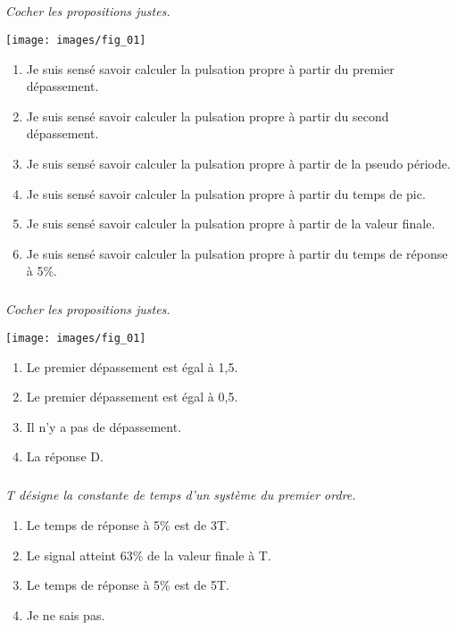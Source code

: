 \documentclass[10pt,fleqn]{article} %
\begin{document}
\begin{multicols}{2}
\subparagraph{}\textit{Cocher les propositions justes.}

\begin{center}
\texttt{[image: images/fig\_01]}
\end{center}

\begin{enumerate}
\item Je suis sensé savoir calculer la pulsation propre à partir du premier
dépassement.
\item Je suis sensé savoir calculer la pulsation propre à partir du second
dépassement.
\item Je suis sensé savoir calculer la pulsation propre à partir de la pseudo
période.
\item Je suis sensé savoir calculer la pulsation propre à partir du temps de pic.
\item Je suis sensé savoir calculer la pulsation propre à partir de la valeur finale.
\item Je suis sensé savoir calculer la pulsation propre à partir du temps de réponse à 5\%.
\end{enumerate}



\subparagraph{}\textit{Cocher les propositions justes.}

\begin{center}
\texttt{[image: images/fig\_01]}
\end{center}
 
\begin{enumerate}
\item Le premier dépassement est égal à 1,5.
\item Le premier dépassement est égal à 0,5.
\item Il n'y a pas de dépassement.
\item La réponse D.
\end{enumerate}



\subparagraph{}\textit{T désigne la constante de temps d'un système du premier ordre.}
\begin{enumerate}
\item Le temps de réponse à 5\% est de 3T.
\item Le signal atteint 63\% de la valeur finale à T.
\item Le temps de réponse à 5\% est de 5T.
\item Je ne sais pas.
\end{enumerate}




\end{multicols}
\end{document}
